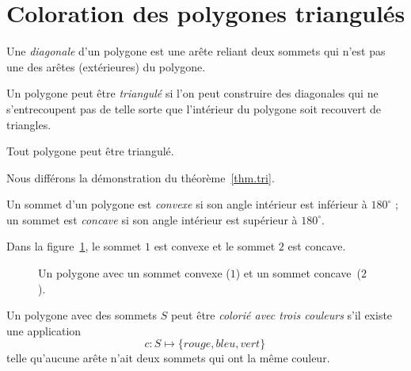 \section{Coloration des polygones triangulés}\label{s.museum-triangulating}

\begin{definition}
Une \emph{diagonale} d'un polygone est une arête reliant deux sommets qui n'est pas une des arêtes (extérieures) du polygone.
\end{definition}

\begin{definition} Un polygone peut être \emph{triangulé} si l'on peut construire des diagonales qui ne s'entrecoupent pas de telle sorte que l'intérieur du polygone soit recouvert de triangles.
\end{definition}
\vspace{-2ex}
\begin{theorem}
Tout polygone peut être triangulé.\label{thm.tri}
\end{theorem}
Nous différons la démonstration du théorème~\ref{thm.tri}.
\begin{definition}
Un sommet d'un polygone est \emph{convexe} si son angle intérieur est inférieur à $180^\circ$ ; un sommet est \emph{concave} si son angle intérieur est supérieur à $180^\circ$. 
\end{definition}
Dans la  figure~\ref{f.museum.arbitrary}, le sommet $1$ est convexe et le sommet $2$ est concave.

\begin{figure}[htbp]
\centering
{}
\caption{Un polygone avec un sommet convexe ($1$) et un sommet concave~($2$).}
\label{f.museum.arbitrary}
\end{figure}

\begin{definition}
Un polygone avec des sommets $S$ peut être \emph{colorié avec trois couleurs} s'il existe une application 
\[c: S\mapsto \{\mathit{rouge},\mathit{bleu},\mathit{vert}\}\,\] 
telle qu'aucune arête n'ait deux sommets qui ont la même couleur.
\end{definition}

